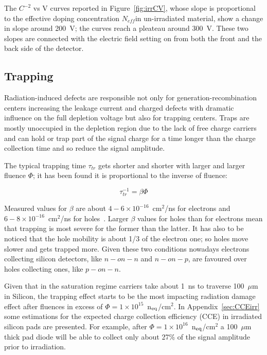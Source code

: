  The $C^{-2}$ vs V curves reported in Figure~\ref{fig:irrCV}, whose slope is proportional to the 
 effective doping concentration $N_{eff}$in un-irradiated material, show a change in slope around 
 200~V; the curves reach a pleateau around 300~V. These two slopes are connected with the 
 electric field setting on from both the front and the back side of the detector.


\subsection{Trapping}
\label{sec:trapping}
Radiation-induced defects are responsible not only for generation-recombination centers increasing 
the leakage current and charged defects with dramatic influence on the full depletion voltage but 
also for trapping centers. Traps are mostly unoccupied in the depletion region due to the lack of free 
charge carriers and can hold or trap part of the signal charge for a time longer than the charge 
collection time and so reduce the signal amplitude. 

The typical trapping time $\tau_{tr}$ gets shorter and shorter with larger and larger fluence $\Phi$; it 
has 
been found it is proportional to the inverse of fluence:

\begin{equation}
\tau_{tr}^{-1}=\beta\Phi
\label{eq:trappingtime}
\end{equation}

Measured values for $\beta$ are about $4-6\times10^{-16}$~cm$^2$/ns for electrons 
and $6-8\times10^{-16}$~cm$^2$/ns for holes~\cite{KRAMBERGER2002297}. Larger $\beta$ 
values for holes than for electrons mean that trapping is most severe for the former than the latter. 
It has also to be noticed that the hole mobility is about 1/3 of the electron one; so holes move 
slower and gets trapped more. Given these two conditions nowadays electrons collecting 
silicon detectors, like $n-on-n$ and $n-on-p$, are favoured over holes collecting ones, like
 $p-on-n$.  

Given that in the saturation regime carriers take about 1~ns to traverse 100~$\mu$m in Silicon, 
the trapping effect starts to be the most impacting radiation damage effect after fluences in excess of $
\Phi=1\times10^{15}$~n$_{\rm eq}$/cm$^2$. In Appendix~\ref{sec:CCEirr} some estimations 
for the expected charge collection efficiency (CCE) in irradiated silicon pads are presented. 
For example, after  $\Phi=1\times10^{16}$~n$_{\rm eq}$/cm$^2$ a 100~$\mu$m thick pad diode 
will be able to collect only about 27\% of the signal amplitude prior to irradiation.

